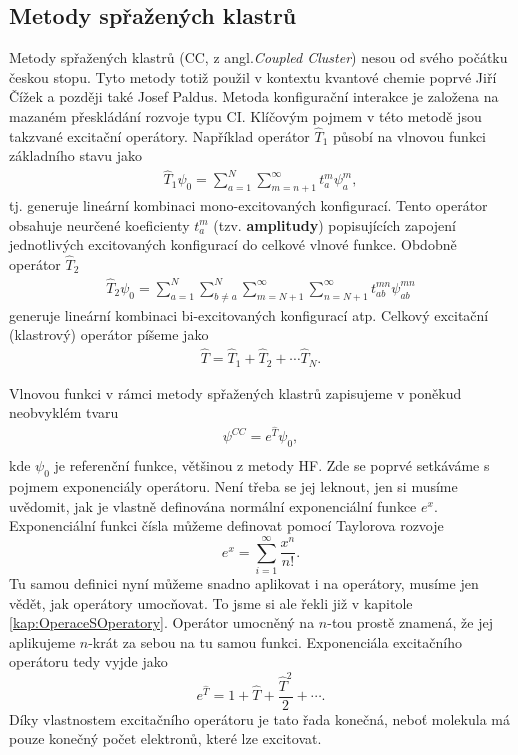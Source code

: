 \subsection{Metody spřažených klastrů}
Metody spřažených klastrů (CC, z angl.\textit{Coupled Cluster}) nesou od svého počátku českou stopu. Tyto metody totiž použil v kontextu kvantové chemie poprvé Jiří Čížek a později také Josef Paldus. Metoda konfigurační interakce je založena na mazaném přeskládání rozvoje typu CI. Klíčovým pojmem v této metodě jsou takzvané excitační operátory. Například operátor $\hat{T}_1$ působí na vlnovou funkci základního stavu jako
\begin{eqnarray}
\hat{T}_1\psi_0=\sum^N_{a=1}\sum_{m=n+1}^\infty t_a^m\psi_a^m , 
\end{eqnarray}
tj. generuje lineární kombinaci mono-excitovaných konfigurací.  Tento operátor obsahuje neurčené koeficienty $t_a^m$ (tzv. \textbf{amplitudy}) popisujících zapojení jednotlivých excitovaných konfigurací do celkové vlnové funkce. Obdobně operátor $\hat{T}_2$ 
\begin{eqnarray}
\hat{T}_2\psi_0=\sum_{a=1}^N \sum_{b\neq a}^N\sum_{m=N+1}^\infty \sum_{n=N+1}^\infty t_{ab}^{mn}\psi_{ab}^{mn}
\end{eqnarray}
generuje lineární kombinaci  bi-excitovaných konfigurací atp. Celkový excitační (klastrový) operátor píšeme jako
\begin{eqnarray}
\hat{T}=\hat{T}_1+\hat{T}_2+\cdots \hat{T}_N.
\end{eqnarray}

Vlnovou funkci v rámci metody spřažených klastrů zapisujeme v poněkud neobvyklém tvaru
\begin{eqnarray}
\psi^{CC} = e^{\hat{T}} \psi_0 ,  \\
\end{eqnarray}
kde $\psi_0$ je referenční funkce, většinou z metody HF. Zde se poprvé setkáváme s pojmem exponenciály operátoru. Není třeba se jej leknout, jen si musíme uvědomit, jak je vlastně definována normální exponenciální funkce $e^x$. Exponenciální funkci čísla můžeme definovat pomocí Taylorova rozvoje
\begin{equation}
e^x=\sum_{i=1}^\infty \frac{x^n}{n!} .
\end{equation}
Tu samou definici nyní můžeme snadno aplikovat i na operátory, musíme jen vědět, jak operátory umocňovat.
To jsme si ale řekli již v kapitole \ref{kap:OperaceSOperatory}. Operátor umocněný na $n$-tou prostě znamená, že jej aplikujeme $n$-krát za sebou na tu samou funkci. Exponenciála excitačního operátoru tedy vyjde jako 
\begin{equation}
e^{\hat{T}} = 1+\hat{T}+\frac{\hat{T}^2}{2}+\cdots.
\end{equation}
Díky vlastnostem excitačního operátoru je tato řada konečná, neboť molekula má pouze konečný počet elektronů, které lze excitovat.

